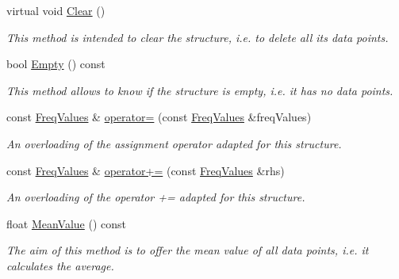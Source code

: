 \begin{DoxyCompactItemize}
virtual void \hyperlink{structFreqValues_a4449e9a4285ba2da83878bbb515e028a}{Clear} ()
\begin{DoxyCompactList}\small\item\em This method is intended to clear the structure, i.\+e. to delete all its data points. \end{DoxyCompactList}\item 
\mbox{\label{structFreqValues_ae5a9b788cbf75ad4c3e1dd1ed86a0ddc}} 
bool \hyperlink{structFreqValues_ae5a9b788cbf75ad4c3e1dd1ed86a0ddc}{Empty} () const
\begin{DoxyCompactList}\small\item\em This method allows to know if the structure is empty, i.\+e. it has no data points. \end{DoxyCompactList}\item 
\mbox{\label{structFreqValues_a3bd1fb05221565c0961391244ceeff72}} 
const \hyperlink{structFreqValues}{Freq\+Values} \& \hyperlink{structFreqValues_a3bd1fb05221565c0961391244ceeff72}{operator=} (const \hyperlink{structFreqValues}{Freq\+Values} \&freq\+Values)
\begin{DoxyCompactList}\small\item\em An overloading of the assignment operator adapted for this structure. \end{DoxyCompactList}\item 
\mbox{\label{structFreqValues_a9bf171252cc08c029901dfa22bd341dd}} 
const \hyperlink{structFreqValues}{Freq\+Values} \& \hyperlink{structFreqValues_a9bf171252cc08c029901dfa22bd341dd}{operator+=} (const \hyperlink{structFreqValues}{Freq\+Values} \&rhs)
\begin{DoxyCompactList}\small\item\em An overloading of the operator += adapted for this structure. \end{DoxyCompactList}\item 
\mbox{\label{structFreqValues_a954b961f99175f11f09d1cd5d834c545}} 
float \hyperlink{structFreqValues_a954b961f99175f11f09d1cd5d834c545}{Mean\+Value} () const
\begin{DoxyCompactList}\small\item\em The aim of this method is to offer the mean value of all data points, i.\+e. it calculates the average. \end{DoxyCompactList}\end{DoxyCompactItemize}
